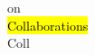 \documentclass[a4paper]{article}
\begin{document}
\begin{multicols*}{2}
\begin{footnotesize}
on \\ \hl{Collaborations} \\ Coll
\end{footnotesize}
\end{multicols*}
\end{document}
